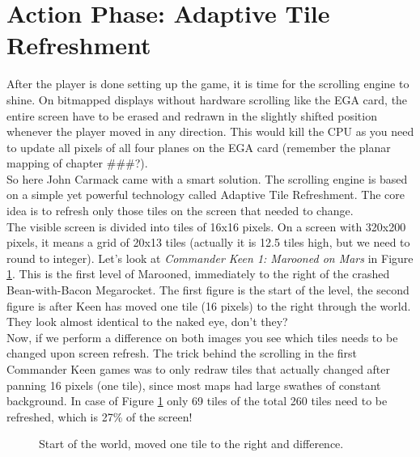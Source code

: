 \documentclass[book.tex]{subfiles}
\begin{document}
\section{Action Phase: Adaptive Tile Refreshment}
After the player is done setting up the game, it is time for the scrolling engine to shine. On bitmapped displays without hardware scrolling like the EGA card, the entire screen have to be erased and redrawn in the slightly shifted position whenever the player moved in any direction. This would kill the CPU as you need to update all pixels of all four planes on the EGA card (remember the planar mapping of chapter \#\#\#?).\\ 

So here John Carmack came with a smart solution. The scrolling engine is based on a simple yet powerful technology called Adaptive Tile Refreshment. The core idea is to  refresh only those tiles on the screen that needed to change.\\

The visible screen is divided into tiles of 16x16 pixels. On a screen with 320x200 pixels, it means a grid of 20x13 tiles (actually it is 12.5 tiles high, but we need to round to integer). Let's look at \textit{Commander Keen 1: Marooned on Mars} in Figure \ref{fig:keen_difference}. This is the first level of Marooned, immediately to the right of the crashed Bean-with-Bacon Megarocket. The first figure is the start of the level, the second figure is after Keen has moved one tile (16 pixels) to the right through the world. They look almost identical to the naked eye, don't they? \\

Now, if we perform a difference on both images you see which tiles needs to be changed upon screen refresh. The trick behind the scrolling in the first Commander Keen games was to only redraw tiles that actually changed after panning 16 pixels (one tile), since most maps had large swathes of constant background. In case of Figure \ref{fig:keen_difference} only 69 tiles of the total 260 tiles need to be refreshed, which is 27\% of the screen! 


\pagebreak
\begin{figure}[H] 
  \centering 
\end{figure}
\begin{figure}[H] 
  \centering 
\end{figure}
\begin{figure}[H] 
  \centering 
  \caption{Start of the world, moved one tile to the right and difference.}
  \label{fig:keen_difference}
\end{figure}
\pagebreak
\end{document}
